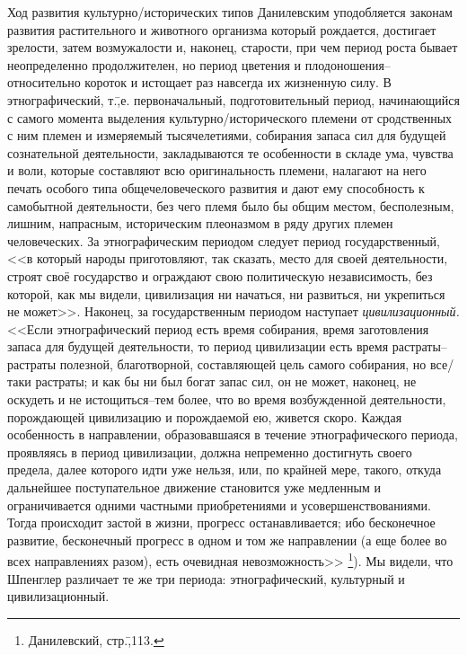 Ход развития культурно\-/исторических типов Данилевским уподобляется законам развития растительного и животного организма который рождается, достигает зрелости, затем возмужалости и, наконец, старости, при чем период роста бывает неопределенно продолжителен, но период цветения и плодоношения\---относительно короток и истощает раз навсегда их жизненную силу. В этнографический, т.\=,е. первоначальный, подготовительный период, начинающийся с самого момента выделения культурно\-/исторического племени от сродственных с ним племен и измеряемый тысячелетиями, собирания запаса сил для будущей сознательной деятельности, закладываются те особенности в складе ума, чувства и воли, которые составляют всю оригинальность племени, налагают на него печать особого типа общечеловеческого развития и дают ему способность к самобытной деятельности, без чего племя было бы общим местом, бесполезным, лишним, напрасным, историческим плеоназмом в ряду других племен человеческих. За этнографическим периодом следует период государственный, <<в который народы приготовляют, так сказать, место для своей деятельности, строят своё государство и ограждают свою политическую независимость, без которой, как мы видели, цивилизация ни начаться, ни развиться, ни укрепиться не может>>. Наконец, за государственным периодом наступает \emph{цивилизационный.} <<Если этнографический период есть время собирания, время заготовления запаса для будущей деятельности, то период цивилизации есть время растраты\---растраты полезной, благотворной, составляющей цель самого собирания, но все\-/таки растраты; и как бы ни был богат запас сил, он не может, наконец, не оскудеть и не истощиться\---тем более, что во время возбужденной деятельности, порождающей цивилизацию и порождаемой ею, живется скоро. Каждая особенность в направлении, образовавшаяся в течение этнографического периода, проявляясь в период цивилизации, должна непременно достигнуть своего предела, далее которого идти уже нельзя, или, по крайней мере, такого, откуда дальнейшее поступательное движение становится уже медленным и ограничивается одними частными приобретениями и усовершенствованиями. Тогда происходит застой в жизни, прогресс останавливается; ибо бесконечное развитие, бесконечный прогресс в одном и том же направлении (а еще более во всех направлениях разом), есть очевидная невозможность>> \footnote{Данилевский, стр.\=,113.}). Мы видели, что Шпенглер различает те же три периода: этнографический, культурный и цивилизационный.

